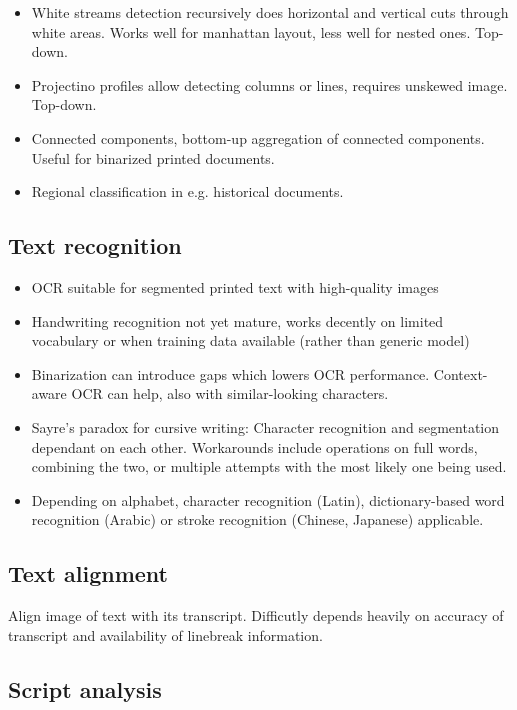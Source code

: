 \begin{itemize}
		\item White streams detection recursively does horizontal and vertical
				cuts through white areas. Works well for manhattan layout, less
				well for nested ones. Top-down.
		\item Projectino profiles allow detecting columns or lines, requires
				unskewed image. Top-down.
		\item Connected components, bottom-up aggregation of connected
				components. Useful for binarized printed documents.
		\item Regional classification in e.g. historical documents.
\end{itemize}

\subsection{Text recognition}

\begin{itemize}
		\item OCR suitable for segmented printed text with high-quality images
		\item Handwriting recognition not yet mature, works decently on limited
				vocabulary or when training data available (rather than generic
				model)
		\item Binarization can introduce gaps which lowers OCR performance.
				Context-aware OCR can help, also with similar-looking
				characters.
		\item Sayre's paradox for cursive writing: Character recognition and
				segmentation dependant on each other. Workarounds include
				operations on full words, combining the two, or multiple
				attempts with the most likely one being used.
		\item Depending on alphabet, character recognition (Latin),
				dictionary-based word recognition (Arabic) or stroke
				recognition (Chinese, Japanese) applicable.
\end{itemize}

\subsection{Text alignment}

Align image of text with its transcript. Difficutly depends heavily on accuracy
of transcript and availability of linebreak information.

\subsection{Script analysis}

